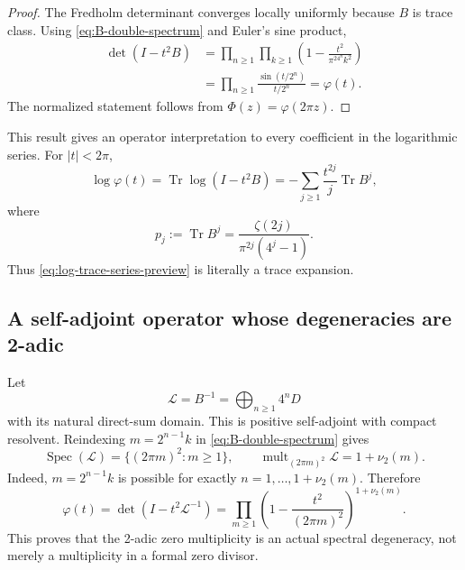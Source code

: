 \documentclass[11pt,oneside]{article}
\theoremstyle{definition}
\newcommand{\Tr}{\operatorname{Tr}}
\newcommand{\Spec}{\operatorname{Spec}}
\newcommand{\vtwo}{\nu_2}
\newcommand{\PhiF}{\Phi}
\newcommand{\phiF}{\varphi}
\begin{document}
\begin{proof}
The Fredholm determinant converges locally uniformly because \(B\) is trace class.
Using \eqref{eq:B-double-spectrum} and Euler's sine product,
\begin{align*}
 \det(I-t^2B)
 &=\prod_{n\ge1}\prod_{k\ge1}
   \left(1-\frac{t^2}{\pi^24^nk^2}\right)\\
 &=\prod_{n\ge1}\frac{\sin(t/2^n)}{t/2^n}
 =\phiF(t).
\end{align*}
The normalized statement follows from \(\PhiF(z)=\phiF(2\pi z)\).
\end{proof}

This result gives an operator interpretation to every coefficient in the logarithmic
series.  For \(|t|<2\pi\),
\begin{equation}
 \log\phiF(t)=\Tr\log(I-t^2B)
 =-\sum_{j\ge1}\frac{t^{2j}}j\Tr B^j,
 \label{eq:operator-log}
\end{equation}
where
\begin{equation}
 \boxed{\quad
 p_j:=\Tr B^j
 =\frac{\zeta(2j)}{\pi^{2j}(4^j-1)}.
 \quad}
 \label{eq:power-traces}
\end{equation}
Thus \eqref{eq:log-trace-series-preview} is literally a trace expansion.

\subsection{A self-adjoint operator whose degeneracies are 2-adic}

Let
\begin{equation}
 \mathscr L=B^{-1}
 =\bigoplus_{n\ge1}4^nD
 \label{eq:L-operator}
\end{equation}
with its natural direct-sum domain.  This is positive self-adjoint with compact
resolvent.  Reindexing \(m=2^{n-1}k\) in \eqref{eq:B-double-spectrum} gives
\begin{equation}
 \Spec(\mathscr L)=
 \bigl\{(2\pi m)^2:m\ge1\bigr\},
 \qquad
 \operatorname{mult}_{(2\pi m)^2}\mathscr L=1+\vtwo(m).
 \label{eq:L-spectrum}
\end{equation}
Indeed, \(m=2^{n-1}k\) is possible for exactly
\(n=1,\ldots,1+\vtwo(m)\).  Therefore
\begin{equation}
 \phiF(t)=\det(I-t^2\mathscr L^{-1})
 =\prod_{m\ge1}\left(1-\frac{t^2}{(2\pi m)^2}\right)^{1+\vtwo(m)}.
 \label{eq:angular-canonical}
\end{equation}
This proves that the 2-adic zero multiplicity is an actual spectral degeneracy, not
merely a multiplicity in a formal zero divisor.
\end{document}
